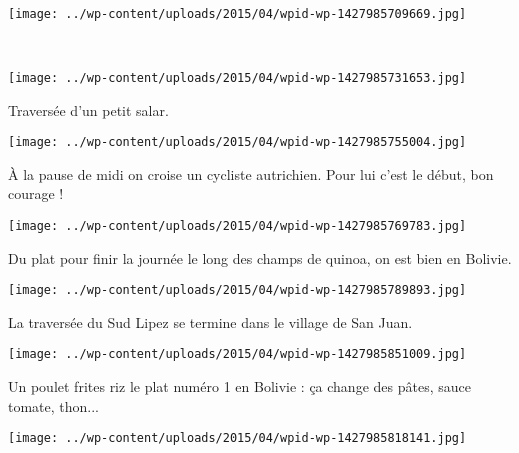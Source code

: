 \pagebreak
~
\begin{center} \texttt{[image: ../wp-content/uploads/2015/04/wpid-wp-1427985709669.jpg]} \end{center}
~\\
\begin{center} \texttt{[image: ../wp-content/uploads/2015/04/wpid-wp-1427985731653.jpg]} \end{center}
\vspace{-\topsep}

\pagebreak
 Traversée d'un petit salar.
\begin{center} \texttt{[image: ../wp-content/uploads/2015/04/wpid-wp-1427985755004.jpg]} \end{center}

 À la pause de midi on croise un cycliste autrichien. Pour lui c'est le début, bon courage !
\begin{center} \texttt{[image: ../wp-content/uploads/2015/04/wpid-wp-1427985769783.jpg]} \end{center}
\vspace{-\topsep}

\pagebreak
 Du plat pour finir la journée le long des champs de quinoa, on est bien en Bolivie.
\begin{center} \texttt{[image: ../wp-content/uploads/2015/04/wpid-wp-1427985789893.jpg]} \end{center}

 La traversée du Sud Lipez se termine dans le village de San Juan.
\begin{center} \texttt{[image: ../wp-content/uploads/2015/04/wpid-wp-1427985851009.jpg]} \end{center}
\vspace{-\topsep}

\pagebreak
 Un poulet frites riz le plat numéro 1 en Bolivie : ça change des pâtes, sauce tomate, thon...
 
 \vspace{3.5mm}
\begin{center} \texttt{[image: ../wp-content/uploads/2015/04/wpid-wp-1427985818141.jpg]} \end{center}
